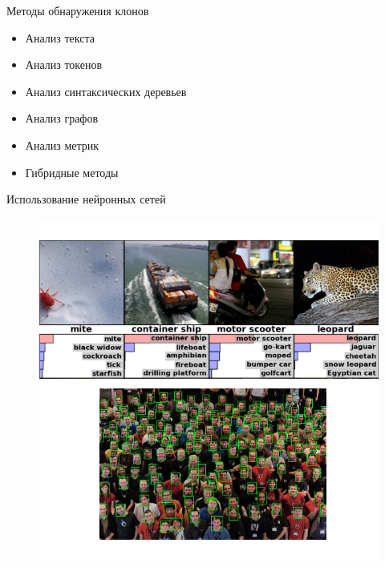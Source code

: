 \documentclass[russian,ignorenonframetext,]{beamer}
\providecommand{\tightlist}{%
  \setlength{\itemsep}{0pt}\setlength{\parskip}{0pt}}
\renewcommand{\caption}[1]{}
\begin{document}
\begin{frame}{Методы обнаружения клонов}
\protect\hypertarget{ux43cux435ux442ux43eux434ux44b-ux43eux431ux43dux430ux440ux443ux436ux435ux43dux438ux44f-ux43aux43bux43eux43dux43eux432}{}

\begin{itemize}
\tightlist
\item
  Анализ текста
\item
  Анализ токенов
\item
  Анализ синтаксических деревьев
\item
  Анализ графов
\item
  Анализ метрик
\item
  Гибридные методы
\end{itemize}

\end{frame}

\begin{frame}{Использование нейронных сетей}
\protect\hypertarget{ux438ux441ux43fux43eux43bux44cux437ux43eux432ux430ux43dux438ux435-ux43dux435ux439ux440ux43eux43dux43dux44bux445-ux441ux435ux442ux435ux439}{}

\begin{figure}
\centering
\includegraphics{merge}
\caption{Usage}
\end{figure}

\end{frame}
\end{document}
